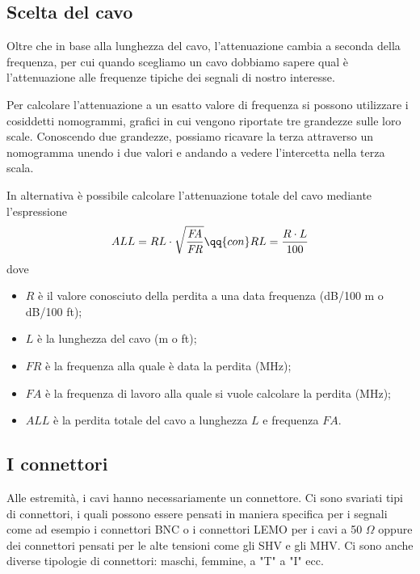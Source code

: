 \subsection{Scelta del cavo}
Oltre che in base alla lunghezza del cavo, l'attenuazione cambia a seconda della frequenza, per cui quando scegliamo un cavo dobbiamo sapere qual è l'attenuazione alle frequenze tipiche dei segnali di nostro interesse.

Per calcolare l'attenuazione a un esatto valore di frequenza si possono utilizzare i cosiddetti nomogrammi, grafici in cui vengono riportate tre grandezze sulle loro scale. Conoscendo due grandezze, possiamo ricavare la terza attraverso un nomogramma unendo i due valori e andando a vedere l'intercetta nella terza scala.

In alternativa è possibile calcolare l'attenuazione totale del cavo mediante l'espressione
\begin{equation*}
   ALL=RL \cdot \sqrt{\frac{\textit{FA}}{\textit{FR}}}
   \qq{con}
   RL=\frac{R \cdot L}{100}
\end{equation*}
dove
\begin{itemize}[leftmargin=0.5cm]
   \item $R$ è il valore conosciuto della perdita a una data frequenza (dB/100 m o dB/100 ft);
   \item $L$ è la lunghezza del cavo (m o ft);
   \item $\textit{FR}$ è la frequenza alla quale è data la perdita (MHz);
   \item $\textit{FA}$ è la frequenza di lavoro alla quale si vuole calcolare la perdita (MHz);
   \item $ALL$ è la perdita totale del cavo a lunghezza $L$ e frequenza $\textit{FA}$.
\end{itemize}

\subsection{I connettori}
Alle estremità, i cavi hanno necessariamente un connettore. Ci sono svariati tipi di connettori, i quali possono essere pensati in maniera specifica per i segnali come ad esempio i connettori BNC o i connettori LEMO per i cavi a 50 $\Omega$ oppure dei connettori pensati per le alte tensioni come gli SHV e gli MHV. Ci sono anche diverse tipologie di connettori: maschi, femmine, a "T" a "I" ecc.

